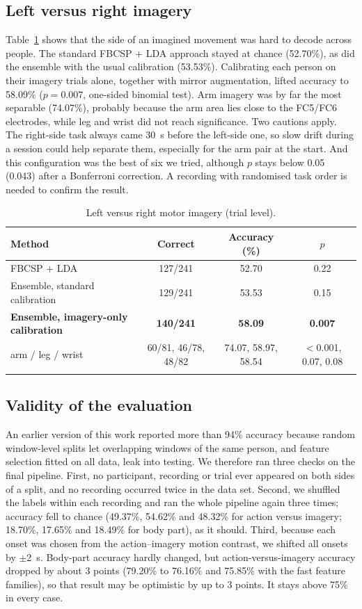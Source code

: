 \documentclass[pdflatex,sn-mathphys-num]{sn-jnl}%
\theoremstyle{thmstyleone}%
\theoremstyle{thmstyletwo}%
\theoremstyle{thmstylethree}%
\begin{document}
\subsection{Left versus right imagery}
Table~\ref{tab:lr} shows that the side of an imagined movement was hard to decode across people. The standard FBCSP + LDA approach stayed at chance (52.70\%), as did the ensemble with the usual calibration (53.53\%). Calibrating each person on their imagery trials alone, together with mirror augmentation, lifted accuracy to 58.09\% ($p = 0.007$, one-sided binomial test). Arm imagery was by far the most separable (74.07\%), probably because the arm area lies close to the FC5/FC6 electrodes, while leg and wrist did not reach significance. Two cautions apply. The right-side task always came 30~s before the left-side one, so slow drift during a session could help separate them, especially for the arm pair at the start. And this configuration was the best of six we tried, although $p$ stays below 0.05 (0.043) after a Bonferroni correction. A recording with randomised task order is needed to confirm the result.

\begin{table}[!htbp]
\centering
\caption{Left versus right motor imagery (trial level).}
\label{tab:lr}
\footnotesize
\begin{tabular}{@{}lccc@{}}
\toprule
Method & Correct & Accuracy (\%) & $p$ \\
\midrule
FBCSP + LDA & 127/241 & 52.70 & 0.22 \\
Ensemble, standard calibration & 129/241 & 53.53 & 0.15 \\
\textbf{Ensemble, imagery-only calibration} & \textbf{140/241} & \textbf{58.09} & \textbf{0.007} \\
\quad arm / leg / wrist & 60/81, 46/78, 48/82 & 74.07, 58.97, 58.54 & $<$0.001, 0.07, 0.08 \\
\botrule
\end{tabular}
\end{table}

\subsection{Validity of the evaluation}
An earlier version of this work reported more than 94\% accuracy because random window-level splits let overlapping windows of the same person, and feature selection fitted on all data, leak into testing. We therefore ran three checks on the final pipeline. First, no participant, recording or trial ever appeared on both sides of a split, and no recording occurred twice in the data set. Second, we shuffled the labels within each recording and ran the whole pipeline again three times; accuracy fell to chance (49.37\%, 54.62\% and 48.32\% for action versus imagery; 18.70\%, 17.65\% and 18.49\% for body part), as it should. Third, because each onset was chosen from the action--imagery motion contrast, we shifted all onsets by $\pm$2~s. Body-part accuracy hardly changed, but action-versus-imagery accuracy dropped by about 3 points (79.20\% to 76.16\% and 75.85\% with the fast feature families), so that result may be optimistic by up to 3 points. It stays above 75\% in every case.
\end{document}
